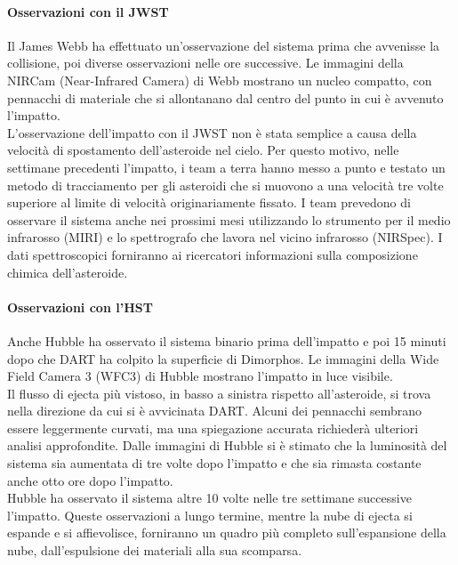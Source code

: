 \documentclass[a4paper,11pt,openright]{book}
\begin{document}
\paragraph*{Osservazioni con il JWST}
Il James Webb ha effettuato un'osservazione del sistema prima che avvenisse la collisione, poi diverse osservazioni nelle ore successive. Le immagini della NIRCam (Near-Infrared Camera) di Webb mostrano un nucleo compatto, con pennacchi di materiale che si allontanano dal centro del punto in cui è avvenuto l'impatto.\\
L'osservazione dell'impatto con il JWST non è stata semplice a causa della velocità di spostamento dell'asteroide nel cielo. Per questo motivo, nelle settimane precedenti l'impatto, i team a terra hanno messo a punto e testato un metodo di tracciamento per gli asteroidi che si muovono a una velocità tre volte superiore al limite di velocità originariamente fissato.
I team prevedono di osservare il sistema anche nei prossimi mesi utilizzando lo strumento per il medio infrarosso (MIRI) e lo spettrografo che lavora nel vicino infrarosso (NIRSpec). I dati spettroscopici forniranno ai ricercatori informazioni sulla composizione chimica dell'asteroide.

\paragraph*{Osservazioni con l'HST}
Anche Hubble ha osservato il sistema binario prima dell'impatto e poi 15 minuti dopo che DART ha colpito la superficie di Dimorphos. Le immagini della Wide Field Camera 3 (WFC3) di Hubble mostrano l'impatto in luce visibile.\\
Il flusso di ejecta più vistoso, in basso a sinistra rispetto all'asteroide, si trova nella direzione da cui si è avvicinata DART. Alcuni dei pennacchi sembrano essere leggermente curvati, ma una spiegazione accurata richiederà ulteriori analisi approfondite. Dalle immagini di Hubble si è stimato che la luminosità del sistema sia aumentata di tre volte dopo l'impatto e che sia rimasta costante anche otto ore dopo l'impatto.\\
Hubble ha osservato il sistema altre 10 volte nelle tre settimane successive l'impatto. Queste osservazioni a lungo termine, mentre la nube di ejecta si espande e si affievolisce, forniranno un quadro più completo sull'espansione della nube, dall'espulsione dei materiali alla sua scomparsa.
\end{document}
